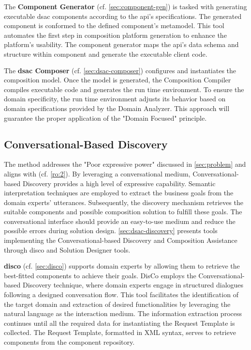 The \textbf{Component Generator }(cf. \cref{sec:component-gen}) is tasked with generating executable \gls{dsac} components according to the \gls{api}’s specifications. The generated component is conformed to the defined component’s metamodel. This tool automates the first step in composition platform generation to enhance the platform's usability. The component generator maps the \gls{api}’s data schema and structure within component and generate the executable client code.

The \textbf{\gls{dsac} Composer} (cf. \cref{sec:dsac-composer}) configures and instantiates the composition model. Once the model is generated, the Composition Compiler compiles executable code and generates the run time environment. To ensure the domain specificity, the run time environment adjusts its behavior based on domain specifications provided by the Domain Analyzer. This approach will guarantee the proper application of the "Domain Focused" principle.

\vspace{-15pt}
\hypertarget{sec:cbdiscovery}{%
\subsection{Conversational-Based Discovery}\label{sec:cbdiscovery}}
\vspace{4pt}

The method addresses the "Poor expressive power" discussed in \cref{sec:problem} and aligns with  (cf. \cref{ro:2}). By leveraging a conversational medium, Conversational-based Discovery provides a high level of expressive capability. Semantic interpretation techniques are employed to extract the business goals from the domain experts' utterances. Subsequently, the discovery mechanism retrieves the suitable components and possible composition solution to fulfill these goals. The conversational interface should provide an easy-to-use medium and reduce the possible errors during solution design. \cref{sec:dsac-discovery} presents tools implementing the Conversational-based Discovery and Composition Assistance through \gls{disco} and Solution Designer tools. 

\textbf{\gls{disco}} (cf. \cref{sec:disco}) supports domain experts by allowing them to retrieve the best-fitted components to achieve their goals. DisCo employs the Conversational-based Discovery technique, where domain experts engage in structured dialogues following a designed conversation flow. This tool facilitates the identification of the target domain and extraction of desired functionalities by leveraging the natural language as the interaction medium. The information extraction process continues until all the required data for instantiating the Request Template is collected. The Request Template, formatted in XML syntax, serves to retrieve components from the component repository. 

